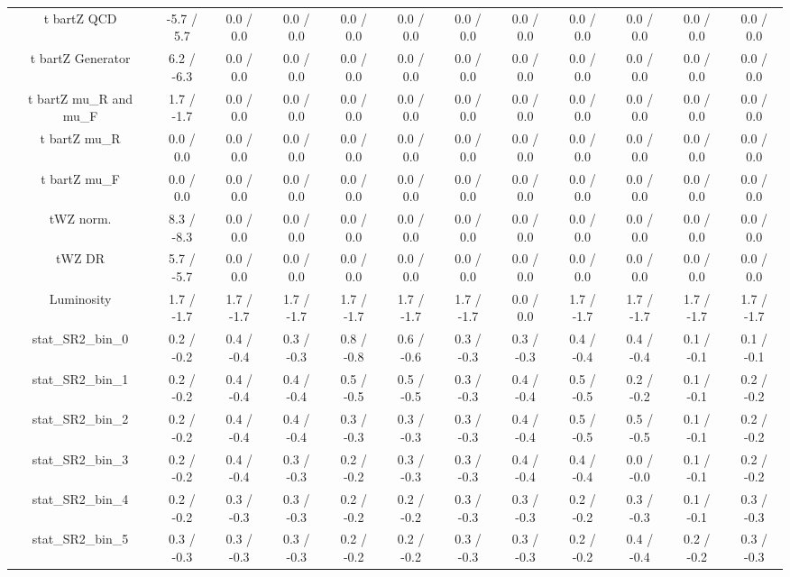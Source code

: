 \begin{table}[htbp]
\begin{center}
\begin{tabular}{|c|c|c|c|c|c|c|c|c|c|c|c|}
  t bar{t}Z QCD & -5.7 / 5.7 & 0.0 / 0.0 & 0.0 / 0.0 & 0.0 / 0.0 & 0.0 / 0.0 & 0.0 / 0.0 & 0.0 / 0.0 & 0.0 / 0.0 & 0.0 / 0.0 & 0.0 / 0.0 & 0.0 / 0.0 \\ 
  t bar{t}Z Generator & 6.2 / -6.3 & 0.0 / 0.0 & 0.0 / 0.0 & 0.0 / 0.0 & 0.0 / 0.0 & 0.0 / 0.0 & 0.0 / 0.0 & 0.0 / 0.0 & 0.0 / 0.0 & 0.0 / 0.0 & 0.0 / 0.0 \\ 
  t bar{t}Z  mu_{R} and  mu_{F} & 1.7 / -1.7 & 0.0 / 0.0 & 0.0 / 0.0 & 0.0 / 0.0 & 0.0 / 0.0 & 0.0 / 0.0 & 0.0 / 0.0 & 0.0 / 0.0 & 0.0 / 0.0 & 0.0 / 0.0 & 0.0 / 0.0 \\ 
  t bar{t}Z  mu_{R} & 0.0 / 0.0 & 0.0 / 0.0 & 0.0 / 0.0 & 0.0 / 0.0 & 0.0 / 0.0 & 0.0 / 0.0 & 0.0 / 0.0 & 0.0 / 0.0 & 0.0 / 0.0 & 0.0 / 0.0 & 0.0 / 0.0 \\ 
  t bar{t}Z  mu_{F} & 0.0 / 0.0 & 0.0 / 0.0 & 0.0 / 0.0 & 0.0 / 0.0 & 0.0 / 0.0 & 0.0 / 0.0 & 0.0 / 0.0 & 0.0 / 0.0 & 0.0 / 0.0 & 0.0 / 0.0 & 0.0 / 0.0 \\ 
  tWZ norm. & 8.3 / -8.3 & 0.0 / 0.0 & 0.0 / 0.0 & 0.0 / 0.0 & 0.0 / 0.0 & 0.0 / 0.0 & 0.0 / 0.0 & 0.0 / 0.0 & 0.0 / 0.0 & 0.0 / 0.0 & 0.0 / 0.0 \\ 
  tWZ DR & 5.7 / -5.7 & 0.0 / 0.0 & 0.0 / 0.0 & 0.0 / 0.0 & 0.0 / 0.0 & 0.0 / 0.0 & 0.0 / 0.0 & 0.0 / 0.0 & 0.0 / 0.0 & 0.0 / 0.0 & 0.0 / 0.0 \\ 
  Luminosity & 1.7 / -1.7 & 1.7 / -1.7 & 1.7 / -1.7 & 1.7 / -1.7 & 1.7 / -1.7 & 1.7 / -1.7 & 0.0 / 0.0 & 1.7 / -1.7 & 1.7 / -1.7 & 1.7 / -1.7 & 1.7 / -1.7 \\ 
 stat_SR2_bin_0 & 0.2 / -0.2 & 0.4 / -0.4 & 0.3 / -0.3 & 0.8 / -0.8 & 0.6 / -0.6 & 0.3 / -0.3 & 0.3 / -0.3 & 0.4 / -0.4 & 0.4 / -0.4 & 0.1 / -0.1 & 0.1 / -0.1 \\ 
 stat_SR2_bin_1 & 0.2 / -0.2 & 0.4 / -0.4 & 0.4 / -0.4 & 0.5 / -0.5 & 0.5 / -0.5 & 0.3 / -0.3 & 0.4 / -0.4 & 0.5 / -0.5 & 0.2 / -0.2 & 0.1 / -0.1 & 0.2 / -0.2 \\ 
 stat_SR2_bin_2 & 0.2 / -0.2 & 0.4 / -0.4 & 0.4 / -0.4 & 0.3 / -0.3 & 0.3 / -0.3 & 0.3 / -0.3 & 0.4 / -0.4 & 0.5 / -0.5 & 0.5 / -0.5 & 0.1 / -0.1 & 0.2 / -0.2 \\ 
 stat_SR2_bin_3 & 0.2 / -0.2 & 0.4 / -0.4 & 0.3 / -0.3 & 0.2 / -0.2 & 0.3 / -0.3 & 0.3 / -0.3 & 0.4 / -0.4 & 0.4 / -0.4 & 0.0 / -0.0 & 0.1 / -0.1 & 0.2 / -0.2 \\ 
 stat_SR2_bin_4 & 0.2 / -0.2 & 0.3 / -0.3 & 0.3 / -0.3 & 0.2 / -0.2 & 0.2 / -0.2 & 0.3 / -0.3 & 0.3 / -0.3 & 0.2 / -0.2 & 0.3 / -0.3 & 0.1 / -0.1 & 0.3 / -0.3 \\ 
 stat_SR2_bin_5 & 0.3 / -0.3 & 0.3 / -0.3 & 0.3 / -0.3 & 0.2 / -0.2 & 0.2 / -0.2 & 0.3 / -0.3 & 0.3 / -0.3 & 0.2 / -0.2 & 0.4 / -0.4 & 0.2 / -0.2 & 0.3 / -0.3 \\ 

\end{tabular}
\end{center}
\end{table}

